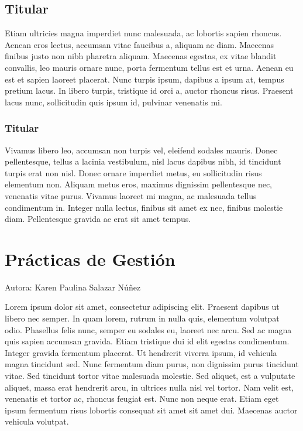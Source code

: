 \documentclass[
  letterpaper,
  DIV=11,
  numbers=noendperiod]{scrreprt}
\begin{document}
\hypertarget{titular-6}{%
\section{Titular}\label{titular-6}}

Etiam ultricies magna imperdiet nunc malesuada, ac lobortis sapien
rhoncus. Aenean eros lectus, accumsan vitae faucibus a, aliquam ac diam.
Maecenas finibus justo non nibh pharetra aliquam. Maecenas egestas, ex
vitae blandit convallis, leo mauris ornare nunc, porta fermentum tellus
est et urna. Aenean eu est et sapien laoreet placerat. Nunc turpis
ipsum, dapibus a ipsum at, tempus pretium lacus. In libero turpis,
tristique id orci a, auctor rhoncus risus. Praesent lacus nunc,
sollicitudin quis ipsum id, pulvinar venenatis mi.

\hypertarget{titular-7}{%
\subsection{Titular}\label{titular-7}}

Vivamus libero leo, accumsan non turpis vel, eleifend sodales mauris.
Donec pellentesque, tellus a lacinia vestibulum, nisl lacus dapibus
nibh, id tincidunt turpis erat non nisl. Donec ornare imperdiet metus,
eu sollicitudin risus elementum non. Aliquam metus eros, maximus
dignissim pellentesque nec, venenatis vitae purus. Vivamus laoreet mi
magna, ac malesuada tellus condimentum in. Integer nulla lectus, finibus
sit amet ex nec, finibus molestie diam. Pellentesque gravida ac erat sit
amet tempus.


\hypertarget{pruxe1cticas-de-gestiuxf3n}{%
\chapter{Prácticas de Gestión}\label{pruxe1cticas-de-gestiuxf3n}}

Autora: Karen Paulina Salazar Núñez

Lorem ipsum dolor sit amet, consectetur adipiscing elit. Praesent
dapibus ut libero nec semper. In quam lorem, rutrum in nulla quis,
elementum volutpat odio. Phasellus felis nunc, semper eu sodales eu,
laoreet nec arcu. Sed ac magna quis sapien accumsan gravida. Etiam
tristique dui id elit egestas condimentum. Integer gravida fermentum
placerat. Ut hendrerit viverra ipsum, id vehicula magna tincidunt sed.
Nunc fermentum diam purus, non dignissim purus tincidunt vitae. Sed
tincidunt tortor vitae malesuada molestie. Sed aliquet, est a vulputate
aliquet, massa erat hendrerit arcu, in ultrices nulla nisl vel tortor.
Nam velit est, venenatis et tortor ac, rhoncus feugiat est. Nunc non
neque erat. Etiam eget ipsum fermentum risus lobortis consequat sit amet
sit amet dui. Maecenas auctor vehicula volutpat.
\end{document}
